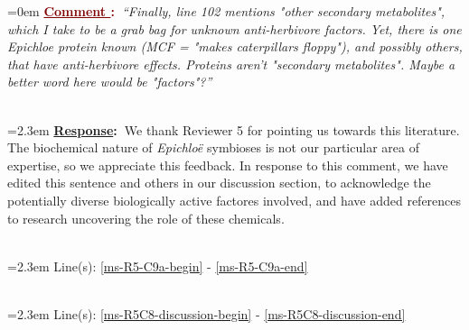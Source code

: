 \documentclass[12pt]{article}
\newcounter{cN}
\newcommand{\comment}[1]{
	\vspace{2em}
	\refstepcounter{cN} %
	\noindent \hangindent=0em \textbf{\textcolor{Maroon}{\uline{Comment \thecN}:~}}\emph{``#1''}
	}
\newcommand{\response}[1]{
	\\[0.25em]
	\hangindent=2.3em \textbf{\textcolor{NavyBlue}{\uline{Response}:~}}#1
	}
\newcommand{\linesref}[2]{
		\\[0.25em]
	\hangindent=2.3em {\color{Mahogany} Line(s): \ref{#1} - \ref{#2}}
}
\begin{document}
\comment{Finally, line 102 mentions "other secondary metabolites", which I take to be a grab bag for unknown anti-herbivore factors. Yet, there is one Epichloe protein known (MCF = "makes caterpillars floppy"), and possibly others, that have anti-herbivore effects. Proteins aren't "secondary metabolites". Maybe a better word here would be "factors"?}
\response{We thank Reviewer 5 for pointing us towards this literature. The biochemical nature of \emph{Epichloë} symbioses is not our particular area of expertise, so we appreciate this feedback. In response to this comment, we have edited this sentence and others in our discussion section, to acknowledge the potentially diverse biologically active factores involved, and have added references to research uncovering the role of these chemicals.}
\linesref{ms-R5-C9a-begin}{ms-R5-C9a-end}
\linesref{ms-R5C8-discussion-begin}{ms-R5C8-discussion-end}











\end{document}
